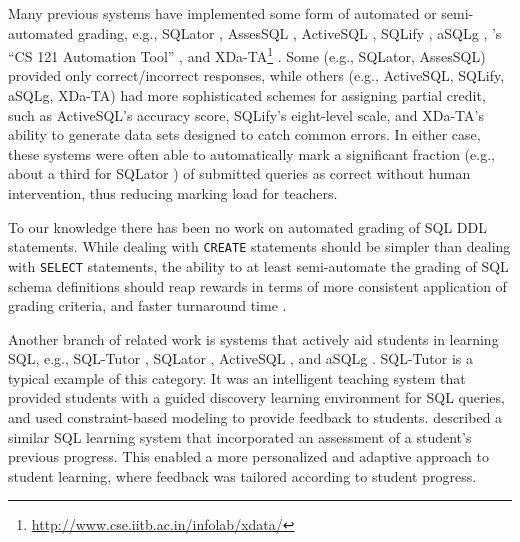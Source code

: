 \documentclass[sigconf, review, anonymous, capitalise]{acmart}
\begin{document}
Many previous systems have implemented some form of automated or semi-automated grading, e.g., SQLator \cite{Sadiq.S-2004a-SQLator}, AssesSQL \cite{Prior.J-2004a-Backwash}, ActiveSQL \cite{Russell.G-2004a-Improving,Russell.G-2005a-Online}, SQLify \cite{Dekeyser.S-2007a-Computer}, aSQLg \cite{Kleiner.C-2013a-Automated}, \citeauthor{Gong.A-2015a-CS-121-Automation}'s ``CS 121 Automation Tool'' \cite{Gong.A-2015a-CS-121-Automation}, and XDa-TA\footnote{\url{http://www.cse.iitb.ac.in/infolab/xdata/}} \cite{Bhangdiya.A-2015a-XDa-TA,Chandra.B-2015a-Data,Chandra.B-2016a-Partial}. Some (e.g., SQLator, AssesSQL) provided only correct/incorrect responses, while others (e.g., ActiveSQL, SQLify, aSQLg, XDa-TA) had more sophisticated schemes for assigning partial credit, such as ActiveSQL's accuracy score, SQLify's eight-level scale, and XDa-TA's ability to generate data sets designed to catch common errors. In either case, these systems were often able to automatically mark a significant fraction (e.g., about a third for SQLator \cite{Sadiq.S-2004a-SQLator}) of submitted queries as correct without human intervention, thus reducing marking load for teachers.

To our knowledge there has been no work on automated grading of SQL DDL statements. While dealing with \texttt{CREATE} statements should be simpler than dealing with \texttt{SELECT} statements, the ability to at least semi-automate the grading of SQL schema definitions should reap rewards in terms of more consistent application of grading criteria, and faster turnaround time \cite{Douce.C-2005a-Automatic,Russell.G-2004a-Improving,Dekeyser.S-2007a-Computer,Prior.J-2004a-Backwash}.

Another branch of related work is systems that actively aid students in learning SQL, e.g., SQL-Tutor \cite{Mitrovic.A-1998a-Learning}, SQLator \cite{Sadiq.S-2004a-SQLator}, ActiveSQL \cite{Russell.G-2004a-Improving}, and aSQLg \cite{Kleiner.C-2013a-Automated}. SQL-Tutor is a typical example of this category. It was an intelligent teaching system that provided students with a guided discovery learning environment for SQL queries, and used constraint-based modeling \cite{Ohlsson.S-1992a-Constraint-based,Ohlsson.S-2016a-Constraint-based} to provide feedback to students. \citeauthor{Kenny.C-2005a-Automated} \cite{Kenny.C-2005a-Automated} described a similar SQL learning system that incorporated an assessment of a student's previous progress. This enabled a more personalized and adaptive approach to student learning, where feedback was tailored according to student progress.
\end{document}

